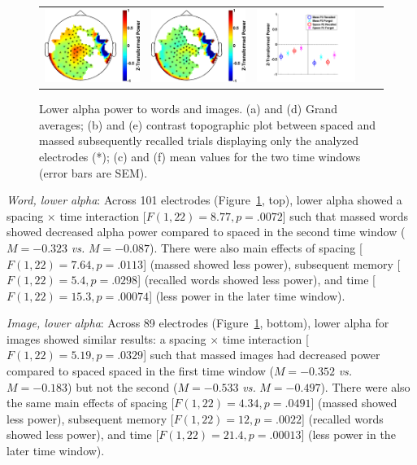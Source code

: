 \begin{figure}[H]
\begin{tabular}{ccccc}
  \includegraphics[width=.19\textwidth]{./figs/exp1/tfr_topocont_ga_img_RgH_rc_spac_p2vsimg_RgH_rc_mass_p2_89ROIs_8_10_0_500_-1p0_1p0_cb} &
  \includegraphics[width=.19\textwidth]{./figs/exp1/tfr_topocont_ga_img_RgH_rc_spac_p2vsimg_RgH_rc_mass_p2_89ROIs_8_10_520_1000_-1p0_1p0_cb} &
  \includegraphics[width=.30\textwidth]{./figs/exp1/tfr_avg_ga_img_RgH_rc_mass_p2_img_RgH_fo_mass_p2_img_RgH_rc_spac_p2_img_RgH_fo_spac_p2_89ROI_0_500_500_1000_8_10_ylabel} \\
  \end{tabular}
  \caption{Lower alpha power to words and images.  (a) and (d) Grand averages; (b) and (e) contrast topographic plot between spaced and massed subsequently recalled trials displaying only the analyzed electrodes (*); (c) and (f) mean values for the two time windows (error bars are SEM).}
  \label{fig:word_img_alpha_low}
\end{figure}

\textit{Word, lower alpha}: Across 101 electrodes (Figure~\ref{fig:word_img_alpha_low}, top), lower alpha showed a spacing $\times$ time interaction [$F(1,22)=8.77, p=.0072$] such that massed words showed decreased alpha power compared to spaced in the second time window ($M=-0.323$ \textit{vs.} $M=-0.087$).
There were also main effects of spacing [$F(1,22)=7.64, p=.0113$] (massed showed less power), subsequent memory [$F(1,22)=5.4, p=.0298$] (recalled words showed less power), and time [$F(1,22)=15.3, p=.00074$] (less power in the later time window).

\textit{Image, lower alpha}: Across 89 electrodes (Figure~\ref{fig:word_img_alpha_low}, bottom), lower alpha for images showed similar results: a spacing $\times$ time interaction [$F(1,22)=5.19, p=.0329$] such that massed images had decreased power compared to spaced spaced in the first time window ($M=-0.352$ \textit{vs.} $M=-0.183$) but not the second ($M=-0.533$ \textit{vs.} $M=-0.497$).
There were also the same main effects of spacing [$F(1,22)=4.34, p=.0491$] (massed showed less power), subsequent memory [$F(1,22)=12, p=.0022$] (recalled words showed less power), and time [$F(1,22)=21.4, p=.00013$] (less power in the later time window).

